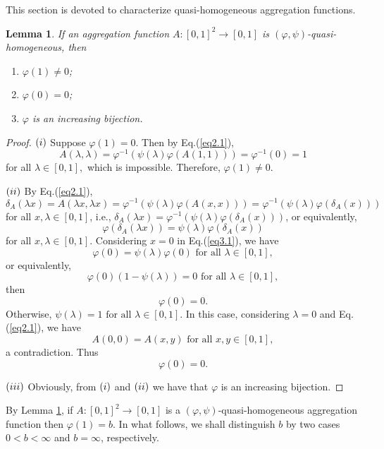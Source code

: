 \documentclass[12pt]{article}
\newtheorem{lemma}{\bf Lemma}[section]
\begin{document}
This section is devoted to characterize quasi-homogeneous aggregation functions.
\begin{lemma}\label{lem3.1}
If an aggregation function $A:[0, 1]^2\rightarrow[0, 1]$ is $(\varphi, \psi)$-quasi-homogeneous, then
\begin{enumerate}
\item [(\romannumeral 1)] $\varphi(1)\neq 0$;
\item [(\romannumeral 2)] $\varphi(0)=0$;
\item [(\romannumeral 3)] $\varphi$ is an increasing bijection.
\end{enumerate}
\end{lemma}
\begin{proof}
$(\romannumeral 1)$ Suppose $\varphi(1)=0$. Then by Eq.(\ref{eq2.1}),
$$A(\lambda,\lambda) =\varphi^{-1}(\psi(\lambda)\varphi(A(1,1))) = \varphi^{-1}(0) = 1$$ for all $\lambda\in[0, 1],$
which is impossible. Therefore, $\varphi(1)\neq 0$.

$(\romannumeral 2)$ By Eq.(\ref{eq2.1}),
$$\delta_{A}(\lambda x)=A(\lambda x, \lambda x) =\varphi^{-1}(\psi(\lambda)\varphi(A(x, x)))=\varphi^{-1}(\psi(\lambda)\varphi(\delta_{A}(x)))$$
for all $ x, \lambda\in[0, 1]$, i.e., $\delta_{A}(\lambda x)=\varphi^{-1}(\psi(\lambda)\varphi(\delta_{A}(x)))$, or equivalently,
\begin{equation}\label{eq3.1}
\varphi(\delta_{A}(\lambda x))=\psi(\lambda)\varphi(\delta_{A}(x))
 \end{equation}
 for all $x, \lambda \in[0, 1]$. Considering $x=0$ in Eq.(\ref{eq3.1}), we have
$$\varphi(0)=\psi(\lambda)\varphi(0)\mbox{ for all } \lambda \in[0, 1],$$
or equivalently,
$$\varphi(0)(1-\psi(\lambda))=0\mbox{ for all } \lambda \in[0, 1],$$
then $$\varphi(0)=0.$$
Otherwise, $\psi(\lambda)=1\mbox{ for all }\lambda \in[0, 1]$. In this case, considering $\lambda=0$ and Eq.(\ref{eq2.1}), we have
$$A(0,0)=A(x,y)\mbox{ for all } x, y \in[0, 1],$$
a contradiction. Thus
$$\varphi(0)=0.$$

$(\romannumeral 3)$ Obviously, from $(\romannumeral 1)$ and $(\romannumeral 2)$ we have that $\varphi$ is an increasing bijection.
\end{proof}


By Lemma \ref{lem3.1}, if $A:[0, 1]^2\rightarrow[0, 1]$ is a $(\varphi, \psi)$-quasi-homogeneous aggregation function then $\varphi(1)=b$. In what follows, we shall distinguish $b$ by two cases $0<b<\infty$ and $b=\infty$, respectively.
\end{document}
